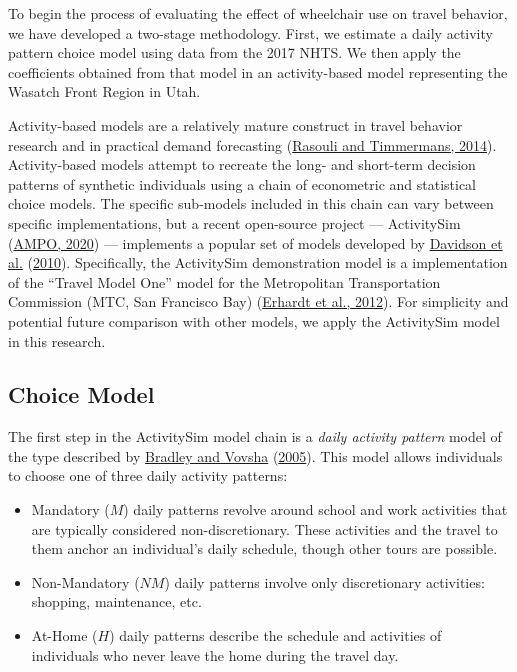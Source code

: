 \documentclass[3p, authoryear, review]{elsarticle} %
\providecommand{\tightlist}{%
  \setlength{\itemsep}{0pt}\setlength{\parskip}{0pt}}
\begin{document}
To begin the process of evaluating the effect of wheelchair use on travel
behavior, we have developed a two-stage methodology. First, we
estimate a daily activity pattern choice model using data from the 2017 NHTS. We
then apply the coefficients obtained from that model in an activity-based model
representing the Wasatch Front Region in Utah.

Activity-based models are a relatively mature construct in travel behavior
research and in practical demand forecasting (\protect\hyperlink{ref-rasouli2014activity}{Rasouli and Timmermans, 2014}). Activity-based models attempt
to recreate the long- and short-term decision patterns of synthetic individuals using a
chain of econometric and statistical choice models. The specific sub-models included
in this chain can vary between specific implementations, but a recent
open-source project --- ActivitySim (\protect\hyperlink{ref-activitysim}{AMPO, 2020}) --- implements a popular
set of models developed by \protect\hyperlink{ref-davidson2010ct}{Davidson et al.} (\protect\hyperlink{ref-davidson2010ct}{2010}). Specifically, the ActivitySim demonstration
model is a implementation of the ``Travel Model One'' model for the Metropolitan
Transportation Commission (MTC, San Francisco Bay) (\protect\hyperlink{ref-erhardt2012mtc}{Erhardt et al., 2012}).
For simplicity and potential future comparison with other models, we apply the
ActivitySim model in this research.

\hypertarget{choice-model}{%
\subsection{Choice Model}\label{choice-model}}

The first step in the ActivitySim model chain is a \emph{daily activity pattern}
model of the type described by \protect\hyperlink{ref-Bradley2005}{Bradley and Vovsha} (\protect\hyperlink{ref-Bradley2005}{2005}). This model
allows individuals to choose one of three daily activity patterns:

\begin{itemize}
\tightlist
\item
  Mandatory (\(M\)) daily patterns revolve around school and work activities that
  are typically considered non-discretionary. These activities and the travel
  to them anchor an individual's daily schedule, though other tours are possible.
\item
  Non-Mandatory (\(NM\)) daily patterns involve only discretionary activities:
  shopping, maintenance, etc.
\item
  At-Home (\(H\)) daily patterns describe the schedule and activities of
  individuals who never leave the home during the travel day.
\end{itemize}
\end{document}
